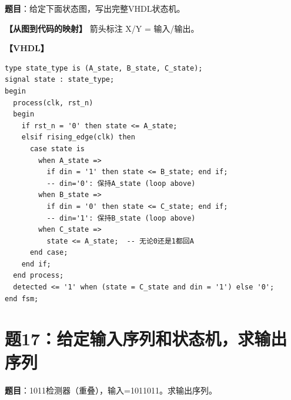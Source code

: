 \textbf{题目}：给定下面状态图，写出完整VHDL状态机。

\begin{center}
\end{center}

\begin{solution}[完整解答]

\textbf{【从图到代码的映射】}
箭头标注 X/Y = 输入/输出。

\textbf{【VHDL】}
\begin{lstlisting}
type state_type is (A_state, B_state, C_state);
signal state : state_type;
begin
  process(clk, rst_n)
  begin
    if rst_n = '0' then state <= A_state;
    elsif rising_edge(clk) then
      case state is
        when A_state =>
          if din = '1' then state <= B_state; end if;
          -- din='0': 保持A_state (loop above)
        when B_state =>
          if din = '0' then state <= C_state; end if;
          -- din='1': 保持B_state (loop above)
        when C_state =>
          state <= A_state;  -- 无论0还是1都回A
      end case;
    end if;
  end process;
  detected <= '1' when (state = C_state and din = '1') else '0';
end fsm;
\end{lstlisting}

\end{solution}


\section{题17：给定输入序列和状态机，求输出序列}

\textbf{题目}：1011检测器（重叠），输入=1011011。求输出序列。

